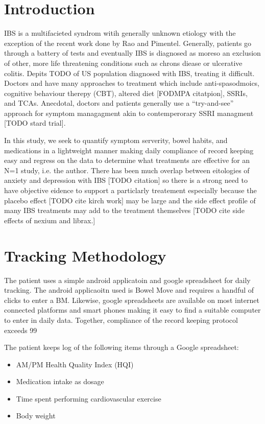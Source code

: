 \documentclass[conference]{IEEEtran}
\begin{document}
\section{Introduction}
IBS is a multifacieted syndrom witih generally unknown etiology with the exception of the recent work done by Rao and Pimentel.  Generally, patients go through a battery of tests and eventually IBS is diagnosed as moreso an exclusion of other, more life threatening conditions such as chrons diease or ulcerative colitis.   Depits TODO of US population diagnosed with IBS, treating it difficult.  Doctors and have many approaches to treatment which include anti-spasodmoics, cognitive behaviour therepy (CBT), altered diet [FODMPA citatpion], SSRIs, and TCAs. Anecdotal, doctors and patients generally use a “try-and-see” approach for symptom managagment akin to contemperorary SSRI managment [TODO stard trial].

In this study, we seek to quantify symptom serverity, bowel habits, and medications in a lightweight manner making daily compliance of record keeping easy and regress on the data to determine what treatments are effective for an N=1 study, i.e. the author.  There has been much overlap between eitologies of anxiety and depression with IBS [TODO citation] so there is a strong need to have objective eidence to support a particlarly treatement especially because the placebo effect [TODO cite kirch work] may be large and the side effect profile of many IBS treatments may add to the treatment themselves [TODO cite side effects of nexium and librax.]

\section{Tracking Methodology}

The patient uses a simple android applicatoin and google spreadsheet for daily tracking.  The android applicaoitn used is Bowel Move and requires a handful of clicks to enter a BM.  Likewise, google spreadsheets are available on most internet connected platforms and smart phones making it easy to find a suitable computer to enter in daily data.  Together, compliance of the record keeping protocol exceeds 99%

The patient keeps log of the following items through a Google spreadsheet:

\begin{itemize}[noitemsep]
\item AM/PM Health Quality Index (HQI)
\item Medication intake as dosage
\item Time spent performing cardiovascular exercise
\item Body weight
\end{itemize}
\end{document}

